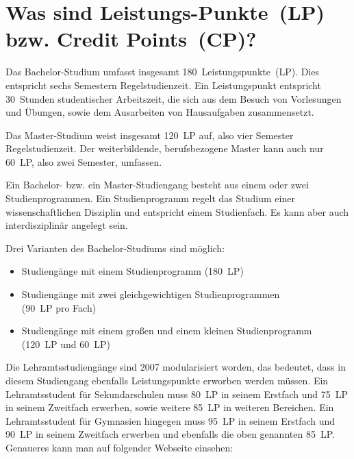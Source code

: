 
\section[Was sind Leistungs-Punkte?]{Was sind Leistungs-Punkte~(LP) bzw. Credit Points~(CP)?}
\label{creditpoints}

Das Bachelor-Studium umfasst insgesamt 180~Leistungspunkte~(LP).
Dies entspricht sechs Semestern Regelstudienzeit.
Ein Leistungspunkt entspricht 30~Stunden studentischer Arbeitszeit, die sich aus dem Besuch von Vorlesungen und Übungen, sowie dem Ausarbeiten von Hausaufgaben zusammensetzt.

Das Master-Studium weist insgesamt 120~LP auf, also vier Semester Regelstudienzeit.
Der weiterbildende, berufsbezogene Master kann auch nur 60~LP, also zwei Semester, umfassen.

Ein Bachelor- bzw. ein Master-Studiengang besteht aus einem oder zwei Studienprogrammen.
Ein Studienprogramm regelt das Studium einer wissenschaftlichen Disziplin und entspricht einem Studienfach.
Es kann aber auch interdisziplinär angelegt sein.

Drei Varianten des Bachelor-Studiums sind möglich:
\begin{itemize}
    \item Studiengänge mit einem Studienprogramm (180~LP)
    \item Studiengänge mit zwei gleichgewichtigen Studienprogrammen\\
          (90~LP pro Fach)
    \item Studiengänge mit einem großen und einem kleinen Studienprogramm\\
          (120~LP und 60~LP)
\end{itemize}

Die Lehramtsstudiengänge sind 2007 modularisiert worden, das bedeutet, dass in diesem Studiengang ebenfalls Leistungspunkte erworben werden müssen.
Ein Lehramtsstudent für Sekundarschulen muss 80~LP in seinem Erstfach und 75~LP in seinem Zweitfach erwerben, sowie weitere 85~LP in weiteren Bereichen.
Ein Lehramtsstudent für Gymnasien hingegen muss 95~LP in seinem Erstfach und 90~LP in seinem Zweitfach erwerben und ebenfalls die oben genannten 85~LP.
Genaueres kann man auf folgender Webseite einsehen:\\[1.0em]
